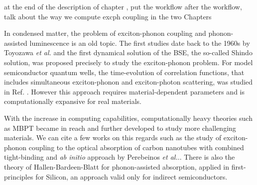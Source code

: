at the end of the description of chapter , put the workflow
after the workflow, talk about the way we compute excph coupling in the two Chapters


In condensed matter, the problem of exciton-phonon coupling and phonon-assisted luminescence is an old topic. The first studies date back to the 1960s by Toyozawa \emph{et al.}\cite{toyozawa2003optical,toyozawa1964interband} and the first dynamical solution of the \acrshort{BSE}, the so-called Shindo solution, was proposed precisely to study the exciton-phonon problem.\cite{shindo1970effective}
For model semiconductor quantum wells, the time-evolution of correlation functions, that includes simultaneous exciton-phonon and exciton-photon scattering, was studied in Ref. \cite{thranhardt2000quantum}. However this approach requires material-dependent parameters and is computationally expansive for real materials.

With the increase in computing capabilities, computationally heavy theories such as \acrshort{MBPT} became in reach and further developed to study more challenging materials. We can cite a few works on this regards such as the study of exciton-phonon coupling to the optical absorption of carbon nanotubes with combined tight-binding and \textit{ab initio} approach by Perebeinos \textit{et al.}.\cite{perebeinos2005effect}. There is also the theory of Hallen-Bardeen-Blatt for phonon-assisted absorption, \cite{hall1954infrared} applied in first-principles for Silicon,\cite{noffsinger2012phonon} an approach valid only for indirect semiconductors. 


